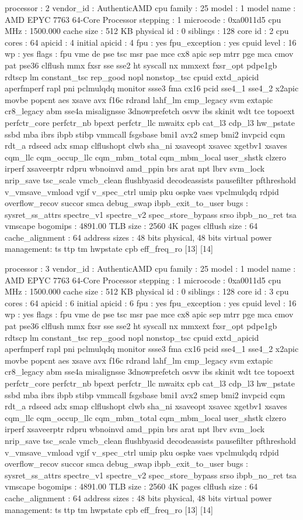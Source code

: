 processor	: 2
vendor_id	: AuthenticAMD
cpu family	: 25
model		: 1
model name	: AMD EPYC 7763 64-Core Processor
stepping	: 1
microcode	: 0xa0011d5
cpu MHz		: 1500.000
cache size	: 512 KB
physical id	: 0
siblings	: 128
core id		: 2
cpu cores	: 64
apicid		: 4
initial apicid	: 4
fpu		: yes
fpu_exception	: yes
cpuid level	: 16
wp		: yes
flags		: fpu vme de pse tsc msr pae mce cx8 apic sep mtrr pge mca cmov pat pse36 clflush mmx fxsr sse sse2 ht syscall nx mmxext fxsr_opt pdpe1gb rdtscp lm constant_tsc rep_good nopl nonstop_tsc cpuid extd_apicid aperfmperf rapl pni pclmulqdq monitor ssse3 fma cx16 pcid sse4_1 sse4_2 x2apic movbe popcnt aes xsave avx f16c rdrand lahf_lm cmp_legacy svm extapic cr8_legacy abm sse4a misalignsse 3dnowprefetch osvw ibs skinit wdt tce topoext perfctr_core perfctr_nb bpext perfctr_llc mwaitx cpb cat_l3 cdp_l3 hw_pstate ssbd mba ibrs ibpb stibp vmmcall fsgsbase bmi1 avx2 smep bmi2 invpcid cqm rdt_a rdseed adx smap clflushopt clwb sha_ni xsaveopt xsavec xgetbv1 xsaves cqm_llc cqm_occup_llc cqm_mbm_total cqm_mbm_local user_shstk clzero irperf xsaveerptr rdpru wbnoinvd amd_ppin brs arat npt lbrv svm_lock nrip_save tsc_scale vmcb_clean flushbyasid decodeassists pausefilter pfthreshold v_vmsave_vmload vgif v_spec_ctrl umip pku ospke vaes vpclmulqdq rdpid overflow_recov succor smca debug_swap ibpb_exit_to_user
bugs		: sysret_ss_attrs spectre_v1 spectre_v2 spec_store_bypass srso ibpb_no_ret tsa vmscape
bogomips	: 4891.00
TLB size	: 2560 4K pages
clflush size	: 64
cache_alignment	: 64
address sizes	: 48 bits physical, 48 bits virtual
power management: ts ttp tm hwpstate cpb eff_freq_ro [13] [14]

processor	: 3
vendor_id	: AuthenticAMD
cpu family	: 25
model		: 1
model name	: AMD EPYC 7763 64-Core Processor
stepping	: 1
microcode	: 0xa0011d5
cpu MHz		: 1500.000
cache size	: 512 KB
physical id	: 0
siblings	: 128
core id		: 3
cpu cores	: 64
apicid		: 6
initial apicid	: 6
fpu		: yes
fpu_exception	: yes
cpuid level	: 16
wp		: yes
flags		: fpu vme de pse tsc msr pae mce cx8 apic sep mtrr pge mca cmov pat pse36 clflush mmx fxsr sse sse2 ht syscall nx mmxext fxsr_opt pdpe1gb rdtscp lm constant_tsc rep_good nopl nonstop_tsc cpuid extd_apicid aperfmperf rapl pni pclmulqdq monitor ssse3 fma cx16 pcid sse4_1 sse4_2 x2apic movbe popcnt aes xsave avx f16c rdrand lahf_lm cmp_legacy svm extapic cr8_legacy abm sse4a misalignsse 3dnowprefetch osvw ibs skinit wdt tce topoext perfctr_core perfctr_nb bpext perfctr_llc mwaitx cpb cat_l3 cdp_l3 hw_pstate ssbd mba ibrs ibpb stibp vmmcall fsgsbase bmi1 avx2 smep bmi2 invpcid cqm rdt_a rdseed adx smap clflushopt clwb sha_ni xsaveopt xsavec xgetbv1 xsaves cqm_llc cqm_occup_llc cqm_mbm_total cqm_mbm_local user_shstk clzero irperf xsaveerptr rdpru wbnoinvd amd_ppin brs arat npt lbrv svm_lock nrip_save tsc_scale vmcb_clean flushbyasid decodeassists pausefilter pfthreshold v_vmsave_vmload vgif v_spec_ctrl umip pku ospke vaes vpclmulqdq rdpid overflow_recov succor smca debug_swap ibpb_exit_to_user
bugs		: sysret_ss_attrs spectre_v1 spectre_v2 spec_store_bypass srso ibpb_no_ret tsa vmscape
bogomips	: 4891.00
TLB size	: 2560 4K pages
clflush size	: 64
cache_alignment	: 64
address sizes	: 48 bits physical, 48 bits virtual
power management: ts ttp tm hwpstate cpb eff_freq_ro [13] [14]

